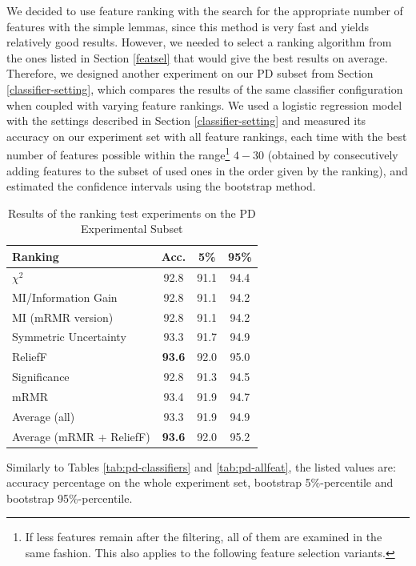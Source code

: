 \documentclass[12pt,notitlepage]{report}
\begin{document}
We decided to use feature ranking with the search for the appropriate number of features with the simple lemmas, since this method is very fast and yields relatively good results. However, we needed to select a ranking algorithm from the ones listed in Section \ref{featsel} that would give the best results on average. Therefore, we designed another experiment on our PD subset from Section \ref{classifier-setting}, which compares the results of the same classifier configuration when coupled with varying feature rankings. We used a logistic regression model with the settings described in Section \ref{classifier-setting} and measured its accuracy on our experiment set with all feature rankings, each time with the best number of features possible within the range\footnote{If less features remain after the filtering, all of them are examined in the same fashion. This also applies to the following feature selection variants.} $4-30$ (obtained by consecutively adding features to the subset of used ones in the order given by the ranking), and estimated the confidence intervals using the bootstrap method. 

\begin{table}[htpb]
\caption{Results of the ranking test experiments on the PD Experimental Subset}\label{tab:ranker-test}\footnotesize
\begin{center}
\begin{tabular}{|l|c|c|c|}\hline
\bf Ranking & \bf Acc. & \bf 5\% & \bf 95\% \\\hline
$\chi^2$ & 92.8 & 91.1 & 94.4 \\
MI/Information Gain & 92.8 & 91.1 & 94.2 \\
MI (mRMR version) & 92.8 & 91.1 & 94.2 \\
Symmetric Uncertainty & 93.3 & 91.7 & 94.9 \\
ReliefF & \bf 93.6 & 92.0 & 95.0 \\
Significance & 92.8 & 91.3 & 94.5 \\
mRMR & 93.4 & 91.9 & 94.7 \\
Average (all) & 93.3 & 91.9 & 94.9 \\
Average (mRMR + ReliefF) & \bf 93.6 & 92.0 & 95.2 \\\hline
\end{tabular}
\end{center}
Similarly to Tables \ref{tab:pd-classifiers} and \ref{tab:pd-allfeat}, the listed values are: accuracy percentage on the whole experiment set, bootstrap 5\%-percentile and bootstrap 95\%-percentile. 
\end{table}
\end{document}

